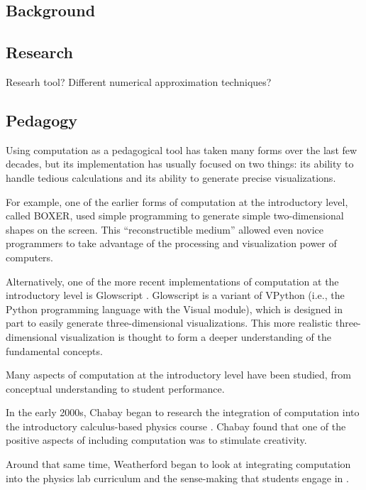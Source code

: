 \documentclass{msuphddissertation}
\begin{document}
\begin{doublespace}
%
%

\chapter{Background}\label{CH2:Background}

\section{Research}

Researh tool?  Different numerical approximation techniques?

\section{Pedagogy}

Using computation as a pedagogical tool has taken many forms over the last few decades, but its implementation has usually focused on two things: its ability to handle tedious calculations and its ability to generate precise visualizations.

For example, one of the earlier forms of computation at the introductory level, called BOXER, used simple programming \cite{BOXER} to generate simple two-dimensional shapes on the screen.  This ``reconstructible medium'' allowed even novice programmers to take advantage of the processing and visualization power of computers.

Alternatively, one of the more recent implementations of computation at the introductory level is Glowscript \cite{Sherer2000}.  Glowscript is a variant of VPython (i.e., the Python programming language with the Visual module), which is designed in part to easily generate three-dimensional visualizations.  This more realistic three-dimensional visualization is thought to form a deeper understanding of the fundamental concepts.

Many aspects of computation at the introductory level have been studied, from conceptual understanding to student performance. 

In the early 2000s, Chabay began to research the integration of computation into the introductory calculus-based physics course \cite{Chabay2008}.  Chabay found that one of the positive aspects of including computation was to stimulate creativity.  

Around that same time, Weatherford began to look at integrating computation into the physics lab curriculum and the sense-making that students engage in \cite{Weatherford2011}.  


\end{doublespace}
\end{document}
